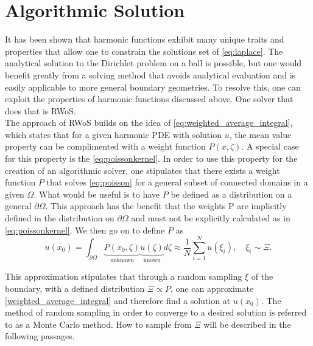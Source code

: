 \section{Algorithmic Solution}
It has been shown that harmonic functions exhibit many unique traits and properties
that allow one to constrain the solutions set of \eqref{eq:laplace}.  The analytical solution to
the Dirichlet problem on a ball is possible, but one would benefit greatly
from a solving method that avoids analytical evaluation and is easily applicable to more
general boundary geometries.  To resolve this, one can exploit the properties
of harmonic functions discussed above.  One solver that does that is \Gls{RWoS}.\\
The approach of \gls{RWoS} builds on the idea of \eqref{eq:weighted_average_integral},
which states that for a given harmonic \gls{PDE} with solution $u$, the mean value
property can be complimented with a weight function $P(x,\zeta)$.  A special case
for this property is the \eqref{eq:poissonkernel}.    In order to
use this property for the creation of an algorithmic solver, one stipulates
that there exists a weight function $P$ that solves \eqref{eq:poisson} for a general subset of connected domains
in a given $\Omega.$ What would be useful is to have $P$ be defined as a distribution
on a general $\partial \Omega$.  This approach has the benefit that the weights P are
implicitly defined in the distribution on $\partial \Omega$ and must not be
explicitly calculated as in \eqref{eq:poissonkernel}. We then go on to define $P$ as
\begin{equation}
  u(x_{0})= \int_{\partial \Omega} \underbrace{P(x_{0},\zeta)}_\text{unknown}
   \underbrace{u(\zeta)}_\text{known} d\zeta \approx \frac{1}{N} \sum_{i=1}^{N} u(\xi_{i}),
   \quad \xi_{i} \sim \Xi.
\end{equation}

This approximation stipulates that through a random sampling $\xi$ of the boundary, with
a defined distribution $\Xi \propto P$, one can approximate \eqref{weighted_average_integral} and therefore
find a solution at $u(x_{0})$.  The method of random sampling in order to converge to a desired solution
is referred to as a Monte Carlo method.  How to sample from $\Xi$ will be described in the following passages.
\par


